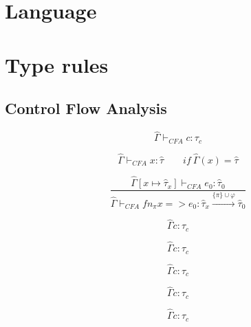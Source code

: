 \documentclass[12pt]{article}
\begin{document}
\maketitle

\begin{abstract}
... \ldots
\end{abstract}

\section{Language}
\section{Type rules}

\subsection{Control Flow Analysis}

\begin{equation} 
\label{con}
\hat{\Gamma} \vdash_{CFA} c : \tau_{c}
\end{equation}

\begin{equation} 
\label{var}
\hat{\Gamma} \vdash_{CFA} x : \hat{\tau} \qquad if \ \hat{\Gamma}(x) = \hat{\tau}
\end{equation}

\begin{equation} 
\label{fn}
\frac{\hat{\Gamma}[x \mapsto \hat{\tau}_{x}]\vdash_{CFA}e_{0}:\hat{\tau}_{0}}{\hat{\Gamma}\vdash_{CFA}fn_{\pi}x=>e_{0}:\hat{\tau}_{x}\xrightarrow{\{\pi\}\cup\varphi}\hat{\tau}_{0}}
\end{equation}

\begin{equation} 
\label{fun}
\hat{\Gamma} c : \tau_{c}
\end{equation}

\begin{equation} 
\label{app}
\hat{\Gamma} c : \tau_{c}
\end{equation}

\begin{equation} 
\label{if}
\hat{\Gamma} c : \tau_{c}
\end{equation}

\begin{equation} 
\label{let}
\hat{\Gamma} c : \tau_{c}
\end{equation}

\begin{equation} 
\label{op}
\hat{\Gamma} c : \tau_{c}
\end{equation}
\end{document}

